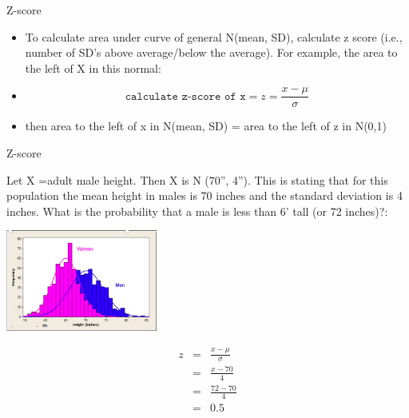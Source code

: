 \documentclass[14pt]{beamer}\usepackage[]{graphicx}\usepackage[]{color}
\begin{document}
\begin{frame}[fragile]{Z-score}

\begin{itemize}
\item To calculate area under curve of general N(mean, SD), calculate z  score (i.e., number of SD's above average/below the average).  For example, the area to  the left of X in this normal:

\item
\begin{equation*}
  \texttt{calculate z-score of x} = z = \frac{x - \mu}{\sigma} 
\end{equation*}

\item then area to the left of x in N(mean, SD) = area to the left of z in N(0,1)
\end{itemize}
\end{frame}

\begin{frame}[fragile]{Z-score}

{\small{
Let X =adult male height. Then X is N (70'', 4''). This is stating that  for this population the mean height in males is 70 inches and the  standard deviation is 4 inches. What is the probability that a male  is less than 6' tall (or 72 inches)?:
}}

\begin{minipage}[ht]{5cm}

\includegraphics[width=5cm]{chapters/chapter6/ext_figure/norm4.png}


\end{minipage}
\begin{minipage}[ht]{5cm}

\begin{eqnarray*}
z &=& \frac{x - \mu}{\sigma} \\
  &=& \frac{x - 70}{4} \\
  &=& \frac{72 - 70}{4} \\
  &=& 0.5
\end{eqnarray*}
\end{minipage}
\end{frame}
\end{document}
